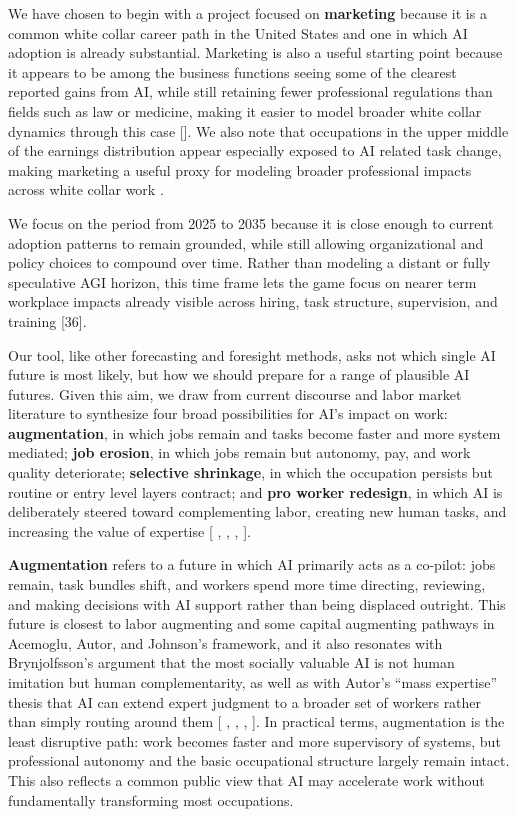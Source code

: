 \documentclass[sigconf,authordraft]{acmart}
\begin{document}
We have chosen to begin with a project focused on \textbf{marketing} because it is a common white collar career path in the United States and one in which AI adoption is already substantial. Marketing is also a useful starting point because it appears to be among the business functions seeing some of the clearest reported gains from AI, while still retaining fewer professional regulations than fields such as law or medicine, making it easier to model broader white collar dynamics through this case [\cite{mckinsey2025state}]. We also note that occupations in the upper middle of the earnings distribution appear especially exposed to AI related task change, making marketing a useful proxy for modeling broader professional impacts across white collar work \cite{acemoglu2026building}.

We focus on the period from 2025 to 2035 because it is close enough to current adoption patterns to remain grounded, while still allowing organizational and policy choices to compound over time. Rather than modeling a distant or fully speculative AGI horizon, this time frame lets the game focus on nearer term workplace impacts already visible across hiring, task structure, supervision, and training [36].

Our tool, like other forecasting and foresight methods, asks not which single AI future is most likely, but how we should prepare for a range of plausible AI futures. Given this aim, we draw from current discourse and labor market literature to synthesize four broad possibilities for AI’s impact on work: \textbf{augmentation}, in which jobs remain and tasks become faster and more system mediated; \textbf{job erosion}, in which jobs remain but autonomy, pay, and work quality deteriorate; \textbf{selective shrinkage}, in which the occupation persists but routine or entry level layers contract; and \textbf{pro worker redesign}, in which AI is deliberately steered toward complementing labor, creating new human tasks, and increasing the value of expertise [\cite{acemoglu2026building} ,  \cite{acemoglu2019automation}, \cite{oecd2023employment}, \cite{rogers2023data}].

\textbf{Augmentation} refers to a future in which AI primarily acts as a co-pilot: jobs remain, task bundles shift, and workers spend more time directing, reviewing, and making decisions with AI support rather than being displaced outright. This future is closest to labor augmenting and some capital augmenting pathways in Acemoglu, Autor, and Johnson’s framework, and it also resonates with Brynjolfsson’s argument that the most socially valuable AI is not human imitation but human complementarity, as well as with Autor’s “mass expertise” thesis that AI can extend expert judgment to a broader set of workers rather than simply routing around them [\cite{acemoglu2019automation} , \cite{brynjolfsson2022turing} \cite{autor2024applying},  \cite{malone2018superminds}, \cite{markoff2015machines}]. In practical terms, augmentation is the least disruptive path: work becomes faster and more supervisory of systems, but professional autonomy and the basic occupational structure largely remain intact. This also reflects a common public view that AI may accelerate work without fundamentally transforming most occupations.
\end{document}
